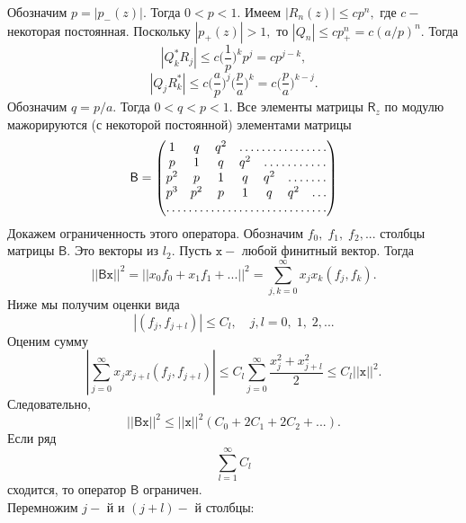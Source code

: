 \documentclass[12pt,a4paper]{article}
\theoremstyle{plain}   \newtheorem{Pro}{Задача}
\begin{document}
Обозначим
$ p=|p_- (z) | . $
Тогда
$ 0<p<1 . $
Имеем
$ |R_n (z) | \leq cp^n , $
где
$ c - $
некоторая постоянная. Поскольку
$ |p_+ (z)| >1 , $
то
$ |Q_n | \leq cp_+ ^n =c( a/p )^n . $
Тогда
$$
  |Q_k ^{\ast} R_j | \leq c \biggl (\frac{1}{p} \biggr )^k p^j =cp^{j-k},
$$
$$
  |Q_j R_k ^{\ast} | \leq c\biggl (\frac{a}{p} \biggr )^j
   \biggl (\frac{p}{a}\biggr )^k =
  c\biggl (\frac{p}{a}\biggr )^{k-j}.
$$
Обозначим
$ q=p/a . $
Тогда
$ 0<q<p<1. $
Все элементы матрицы
$ \mathsf{R}_z $
по модулю мажорируются (с некоторой постоянной) элементами матрицы
\begin{equation*}
  \mathsf{B}=
    \begin{pmatrix}
	  1 & q & q^2 & \hdotsfor{4}\\
	  p & 1 & q & q^2 & \hdotsfor{3}\\
	  p^2 & p & 1 & q & q^2 & \hdotsfor{2}\\
	  p^3 & p^2 & p & 1 & q & q^2 & \dots \\
	  \hdotsfor{7}
	\end{pmatrix}
\end{equation*}
Докажем ограниченность этого оператора. Обозначим
$ f_0 , \; f_1 , \; f_2 ,... $
столбцы матрицы
$ \mathsf{B}. $
Это векторы из
$ l_2 . $
Пусть
$ \mathtt{x} - $
любой финитный вектор. Тогда
$$
  || \mathsf{B} \mathtt{x} ||^2 =
  || x_0 f_0 +x_1 f_1 +... ||^2 =
  \sum _{j,k=0}^{\infty}
  x_j x_k (f_j , f_k ) .
$$
Ниже мы получим оценки вида
$$
  |(f_j , f_{j+l})| \leq C_l ,
  \quad j,l=0, \; 1, \; 2,...
$$
Оценим сумму
$$
  | \sum _{j=0}^{\infty} x_j x_{j+l} (f_j , f_{j+l})|
  \leq C_l \sum _{j=0}^{\infty}
  \frac{x_j ^2 + x_{j+l}^2}{2}
  \leq C_l || \mathtt{x} ||^2 .
$$
Следовательно,
$$
  || \mathsf{B} \mathtt{x} ||^2 \leq
  || \mathtt{x} ||^2 ( C_0 +2C_1 +2C_2 +...).
$$
Если ряд
$$
  \sum _{l=1}^{\infty} C_l
$$
сходится, то оператор
$ \mathsf{B} $
ограничен.\\
Перемножим $ j- $ й и $ (j+l)- $ й столбцы:
\end{document}
